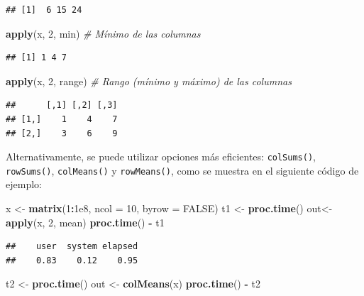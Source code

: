\documentclass[
]{book}
\newenvironment{Shaded}{\begin{snugshade}}{\end{snugshade}}
\newcommand{\AttributeTok}[1]{\textcolor[rgb]{0.13,0.29,0.53}{#1}}
\newcommand{\CommentTok}[1]{\textcolor[rgb]{0.56,0.35,0.01}{\textit{#1}}}
\newcommand{\ConstantTok}[1]{\textcolor[rgb]{0.56,0.35,0.01}{#1}}
\newcommand{\DecValTok}[1]{\textcolor[rgb]{0.00,0.00,0.81}{#1}}
\newcommand{\FloatTok}[1]{\textcolor[rgb]{0.00,0.00,0.81}{#1}}
\newcommand{\FunctionTok}[1]{\textcolor[rgb]{0.13,0.29,0.53}{\textbf{#1}}}
\newcommand{\NormalTok}[1]{#1}
\newcommand{\OtherTok}[1]{\textcolor[rgb]{0.56,0.35,0.01}{#1}}
\newcommand{\SpecialCharTok}[1]{\textcolor[rgb]{0.81,0.36,0.00}{\textbf{#1}}}
\begin{document}
\begin{verbatim}
## [1]  6 15 24
\end{verbatim}

\begin{Shaded}
\begin{Highlighting}[]
\FunctionTok{apply}\NormalTok{(x, }\DecValTok{2}\NormalTok{, min)    }\CommentTok{\# Mínimo de las columnas}
\end{Highlighting}
\end{Shaded}

\begin{verbatim}
## [1] 1 4 7
\end{verbatim}

\begin{Shaded}
\begin{Highlighting}[]
\FunctionTok{apply}\NormalTok{(x, }\DecValTok{2}\NormalTok{, range)  }\CommentTok{\# Rango (mínimo y máximo) de las columnas}
\end{Highlighting}
\end{Shaded}

\begin{verbatim}
##      [,1] [,2] [,3]
## [1,]    1    4    7
## [2,]    3    6    9
\end{verbatim}

Alternativamente, se puede utilizar opciones más eficientes: \texttt{colSums()}, \texttt{rowSums()}, \texttt{colMeans()} y \texttt{rowMeans()}, como se muestra en el siguiente código de ejemplo:

\begin{Shaded}
\begin{Highlighting}[]
\NormalTok{x }\OtherTok{\textless{}{-}} \FunctionTok{matrix}\NormalTok{(}\DecValTok{1}\SpecialCharTok{:}\FloatTok{1e8}\NormalTok{, }\AttributeTok{ncol =} \DecValTok{10}\NormalTok{, }\AttributeTok{byrow =} \ConstantTok{FALSE}\NormalTok{)}
\NormalTok{t1 }\OtherTok{\textless{}{-}} \FunctionTok{proc.time}\NormalTok{()}
\NormalTok{out}\OtherTok{\textless{}{-}}\FunctionTok{apply}\NormalTok{(x, }\DecValTok{2}\NormalTok{, mean)   }
\FunctionTok{proc.time}\NormalTok{() }\SpecialCharTok{{-}}\NormalTok{ t1}
\end{Highlighting}
\end{Shaded}

\begin{verbatim}
##    user  system elapsed 
##    0.83    0.12    0.95
\end{verbatim}

\begin{Shaded}
\begin{Highlighting}[]
\NormalTok{t2 }\OtherTok{\textless{}{-}} \FunctionTok{proc.time}\NormalTok{()}
\NormalTok{out }\OtherTok{\textless{}{-}} \FunctionTok{colMeans}\NormalTok{(x)}
\FunctionTok{proc.time}\NormalTok{() }\SpecialCharTok{{-}}\NormalTok{ t2}
\end{Highlighting}
\end{Shaded}
\end{document}
